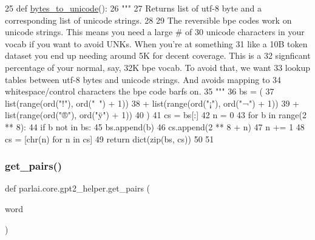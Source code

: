 \begin{DoxyCode}
25 \textcolor{keyword}{def }\hyperlink{namespaceparlai_1_1core_1_1gpt2__helper_ae992d8ce81708900b1b1bb81bc7a816d}{bytes\_to\_unicode}():
26     \textcolor{stringliteral}{"""}
27 \textcolor{stringliteral}{    Returns list of utf-8 byte and a corresponding list of unicode strings.}
28 \textcolor{stringliteral}{}
29 \textcolor{stringliteral}{    The reversible bpe codes work on unicode strings. This means you need a large # of}
30 \textcolor{stringliteral}{    unicode characters in your vocab if you want to avoid UNKs. When you're at something}
31 \textcolor{stringliteral}{    like a 10B token dataset you end up needing around 5K for decent coverage. This is a}
32 \textcolor{stringliteral}{    signficant percentage of your normal, say, 32K bpe vocab. To avoid that, we want}
33 \textcolor{stringliteral}{    lookup tables between utf-8 bytes and unicode strings. And avoids mapping to}
34 \textcolor{stringliteral}{    whitespace/control characters the bpe code barfs on.}
35 \textcolor{stringliteral}{    """}
36     bs = (
37         list(range(ord(\textcolor{stringliteral}{"!"}), ord(\textcolor{stringliteral}{"~"}) + 1))
38         + list(range(ord(\textcolor{stringliteral}{"¡"}), ord(\textcolor{stringliteral}{"¬"}) + 1))
39         + list(range(ord(\textcolor{stringliteral}{"®"}), ord(\textcolor{stringliteral}{"ÿ"}) + 1))
40     )
41     cs = bs[:]
42     n = 0
43     \textcolor{keywordflow}{for} b \textcolor{keywordflow}{in} range(2 ** 8):
44         \textcolor{keywordflow}{if} b \textcolor{keywordflow}{not} \textcolor{keywordflow}{in} bs:
45             bs.append(b)
46             cs.append(2 ** 8 + n)
47             n += 1
48     cs = [chr(n) \textcolor{keywordflow}{for} n \textcolor{keywordflow}{in} cs]
49     \textcolor{keywordflow}{return} dict(zip(bs, cs))
50 
51 
\end{DoxyCode}
\mbox{\label{namespaceparlai_1_1core_1_1gpt2__helper_ac5bffa2aece99e43444185ba85dff425}} 
\subsubsection{\texorpdfstring{get\+\_\+pairs()}{get\_pairs()}}
{\footnotesize\ttfamily def parlai.\+core.\+gpt2\+\_\+helper.\+get\+\_\+pairs (\begin{DoxyParamCaption}\item[{}]{word }\end{DoxyParamCaption})}

